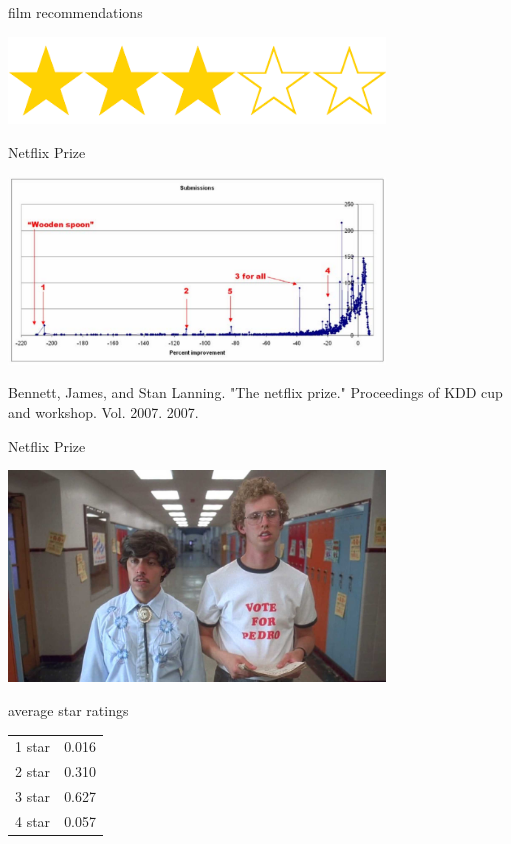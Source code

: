 \documentclass{beamer}
\begin{document}
\begin{frame}{film  recommendations}
  \begin{center}
    \includegraphics[width=10cm]{stars.png}
  \end{center}
\end{frame}


\begin{frame}{Netflix Prize}
  \begin{center}
    \includegraphics[width=10cm]{netflix_prize.png}
  \end{center}
  \vfill
\tiny{Bennett, James, and Stan Lanning. "The netflix prize." Proceedings of KDD cup and workshop. Vol. 2007. 2007.}
\end{frame}

\begin{frame}{Netflix Prize}
  \begin{center}
    \includegraphics[width=10cm]{napoleon.jpg}
  \end{center}
\end{frame}

\begin{frame}{average star ratings}
  \begin{center}
    \begin{tabular}{l|l}
      \hline
      1 star&0.016\\
      2 star&0.310\\
      3 star&0.627\\
      4 star&0.057\\
      \hline
    \end{tabular}
  \end{center}
\end{frame}
\end{document}
